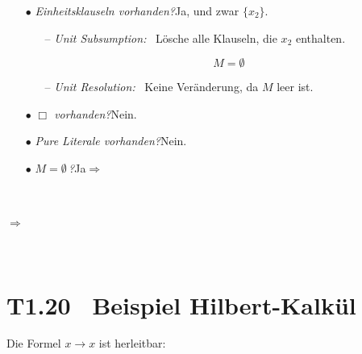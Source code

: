 \documentclass[fontsize=11pt, twoside=false, numbers=autoenddot]{scrbook}
\begin{document}
{{\begin{itemize}
{{\begin{itemize}
\begin{itemize}
\[                  M = \big\{\{x_2\}\big\}
                \]
                \par\vspace*{-.1\baselineskip}
            \end{itemize}
          \item[$\bullet$]
            \emph{Einheitsklauseln vorhanden?}\quad Ja, und zwar $\{x_2\}$.
            \begin{itemize}
              \item[--]
                \emph{Unit Subsumption:}~ Lösche alle Klauseln, die $x_2$ enthalten.
                \par\vspace*{-.5\baselineskip}
                \[
                  M = \emptyset
                \]
                \par\vspace*{-.1\baselineskip}
              \item[--]
                \emph{Unit Resolution:}~ Keine Veränderung, da $M$ leer ist.
            \end{itemize}
          \item[$\bullet$]
            \emph{$\Box$ vorhanden?}\quad Nein.
          \item[$\bullet$]
            \emph{Pure Literale vorhanden?}\quad Nein.
          \item[$\bullet$]
            \emph{$M = \emptyset$\,?}\quad Ja\quad $\Rightarrow$ 
        \end{itemize}
        ~\par\vspace*{-1\baselineskip}
      }}

      \par\smallskip
      $\Rightarrow$ 
  \end{itemize}
  ~\par\vspace*{-1.4\baselineskip}
}}

\section*{T1.20~ Beispiel Hilbert-Kalkül}

Die Formel $x \to x$ ist herleitbar:
\end{document}

